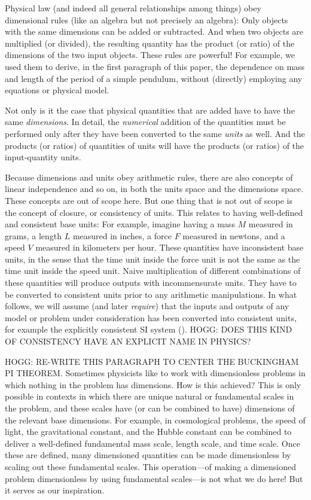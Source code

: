 \documentclass[12pt, letterpaper]{article}
\begin{document}
Physical law (and indeed all general relationships among things) obey dimensional rules (like an algebra but not precisely an algebra):
Only objects with the same dimensions can be added or subtracted.
And when two objects are multiplied (or divided), the resulting quantity has the product (or ratio) of the dimensions of the two input objects.
These rules are powerful!
For example, we used them to derive, in the first paragraph of this paper, the dependence on mass and length of the period of a simple pendulum, without (directly) employing any equations or physical model.

Not only is it the case that physical quantities that are added have to have the same \emph{dimensions}.
In detail, the \emph{numerical} addition of the quantities must be performed only after they have been converted to the same \emph{units} as well.
And the products (or ratios) of quantities of units will have the products (or ratios) of the input-quantity units.

Because dimensions and units obey arithmetic rules, there are also concepts of linear independence and so on, in both the units space and the dimensions space.
These concepts are out of scope here.
But one thing that is not out of scope is the concept of closure, or consistency of units.
This relates to having well-defined and consistent base units:
For example, imagine having a mass $M$ measured in grams, a length $L$ measured in inches, a force $F$ measured in newtons, and a speed $V$ measured in kilometers per hour. These quantities have inconsistent base units, in the sense that the time unit inside the force unit is not the same as the time unit inside the speed unit.
Naive multiplication of different combinations of these quantities will produce outputs with incommensurate units.
They have to be converted to consistent units prior to any arithmetic manipulations.
In what follows, we will assume (and later \emph{require}) that the inputs and outputs of any model or problem under consideration has been converted into consistent units, for example the explicitly consistent SI system (\cite{si}).
HOGG: DOES THIS KIND OF CONSISTENCY HAVE AN EXPLICIT NAME IN PHYSICS?

HOGG: RE-WRITE THIS PARAGRAPH TO CENTER THE BUCKINGHAM PI THEOREM.
Sometimes physicists like to work with dimensionless problems in which nothing in the problem has dimensions.
How is this achieved?
This is only possible in contexts in which there are unique natural or fundamental scales in the problem, and these scales have (or can be combined to have) dimensions of the relevant base dimensions.
For example, in cosmological problems, the speed of light, the gravitational constant, and the Hubble constant can be combined to deliver a well-defined fundamental mass scale, length scale, and time scale.
Once these are defined, many dimensioned quantities can be made dimensionless by scaling out these fundamental scales.
This operation---of making a dimensioned problem dimensionless by using fundamental scales---is not what we do here!
But it serves as our inspiration.
\end{document}
